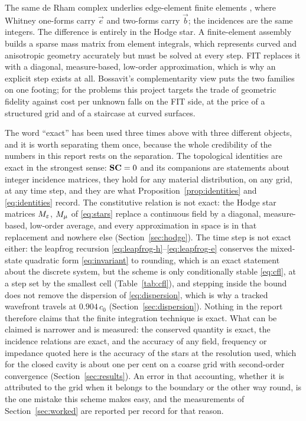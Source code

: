The same de Rham complex underlies edge-element finite elements \cite{bossavit1998,jin2014}, where Whitney one-forms
carry $\vec e$ and two-forms carry $\vec b$; the incidences are the same integers. The difference is entirely in
the Hodge star. A finite-element assembly builds a sparse mass matrix from element integrals, which represents
curved and anisotropic geometry accurately but must be solved at every step. FIT replaces it with a diagonal,
measure-based, low-order approximation, which is why an explicit step exists at all. Bossavit's complementarity
view puts the two families on one footing; for the problems this project targets the trade of geometric fidelity
against cost per unknown falls on the FIT side, at the price of a structured grid and of a staircase at curved
surfaces.

\begin{remark}
\label{rem:exact}
The word ``exact'' has been used three times above with three different objects, and it is worth separating them
once, because the whole credibility of the numbers in this report rests on the separation. The topological
identities are exact in the strongest sense: $\mathbf{S}\mathbf{C}=0$ and its companions are statements about integer
incidence matrices, they hold for any material distribution, on any grid, at any time step, and they are what
Proposition~\ref{prop:identities} and \eqref{eq:identities} record. The constitutive relation is not exact: the
Hodge star matrices ${M_{\varepsilon}}$, ${M_{\mu}}$ of \eqref{eq:stars} replace a continuous field by a diagonal, measure-based,
low-order average, and every approximation in space is in that replacement and nowhere else
(Section~\ref{sec:hodge}). The time step is not exact either: the leapfrog recursion
\eqref{eq:leapfrog-h}--\eqref{eq:leapfrog-e} conserves the mixed-state quadratic form \eqref{eq:invariant} to
rounding, which is an exact statement about the discrete system, but the scheme is only conditionally stable
\eqref{eq:cfl}, at a step set by the smallest cell (Table~\ref{tab:cfl}), and stepping inside the bound does not
remove the dispersion of \eqref{eq:dispersion}, which is why a tracked wavefront travels at $0.904\,c_0$
(Section~\ref{sec:dispersion}). Nothing in the report therefore claims that the finite integration technique is
exact. What can be claimed is narrower and is measured: the conserved quantity is exact, the incidence relations
are exact, and the accuracy of any field, frequency or impedance quoted here is the accuracy of the stars at the
resolution used, which for the closed cavity is about one per cent on a coarse grid with second-order convergence
(Section~\ref{sec:results}). An error in that accounting, whether it is attributed to the grid when it belongs to
the boundary or the other way round, is the one mistake this scheme makes easy, and the measurements of
Section~\ref{sec:worked} are reported per record for that reason.
\end{remark}

